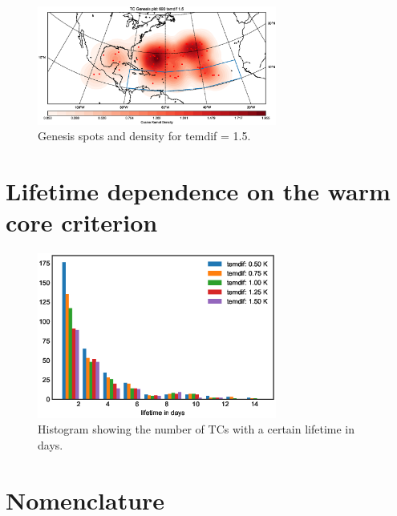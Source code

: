 \begin{figure}[ht]
	\centering
	\includegraphics[width=0.7\textwidth]{img/genesis_plot_temdif15.eps}
	\caption{Genesis spots and density for temdif = 1.5.}
\end{figure}

\chapter{Lifetime dependence on the warm core criterion}\label{sec:lifetime-appendix}

\begin{figure}[ht]
	\centering
	\includegraphics[width=0.7\textwidth]{img/lifetime_for_different_temdif.eps}
	\caption{Histogram showing the number of TCs with a certain lifetime in days.}
\end{figure}

 
 

\chapter*{Nomenclature}\label{chap:symbole}
 
